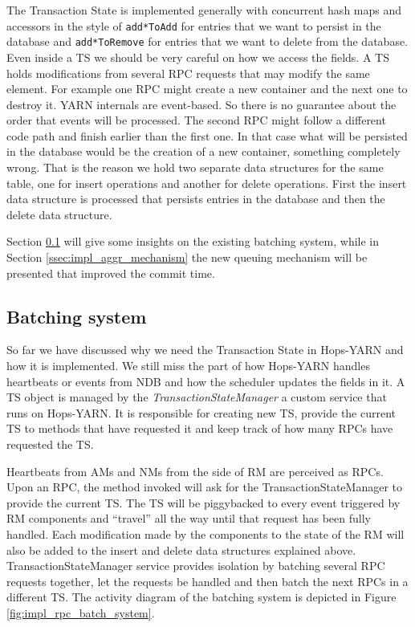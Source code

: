 The Transaction State is implemented generally with concurrent hash maps and
accessors in the style of \texttt{add*ToAdd} for entries that we
want to persist in the database and \texttt{add*ToRemove} for entries
that we want to delete from the database. Even inside a TS we should
be very careful on how we access the fields. A TS holds modifications
from several RPC requests that may modify the same element. For
example one RPC might create a new container and the next one to
destroy it. YARN internals are event-based. So there is no guarantee
about the order that events will be processed. The second RPC might
follow a different code path and finish earlier than the first one. In
that case what will be persisted in the database would be the creation
of a new container, something completely wrong. That is the reason
we hold two separate data structures for the same table, one for
insert operations and another for delete operations. First the insert
data structure is processed that persists entries in the database and
then the delete data structure.

Section \ref{ssec:impl_batch_system} will give some insights on
the existing batching system, while in Section
\ref{ssec:impl_aggr_mechanism} the new queuing
mechanism will be presented that improved the commit time.

\subsection{Batching system}
\label{ssec:impl_batch_system}
So far we have discussed why we need the Transaction State in
Hops-YARN and how it is implemented. We still miss the part of how
Hops-YARN handles heartbeats or events from NDB and how the scheduler
updates the fields in it. A TS object is managed by the
\emph{TransactionStateManager} a custom service that runs on Hops-YARN.
It is responsible for creating new TS, provide the
current TS to methods that have requested it and keep track of how many
RPCs have requested the TS.

Heartbeats from AMs and NMs from the side of RM are perceived as
RPCs. Upon an RPC, the method invoked will ask for the TransactionStateManager
to provide the current TS. The TS will be piggybacked to every event
triggered by RM components and ``travel'' all the way until that
request has been fully handled. Each modification made by the components
to the state of the RM will also be added to the insert and delete
data structures explained above. TransactionStateManager service
provides isolation by batching several RPC requests together, let the
requests be handled and then batch the next RPCs in a different
TS. The activity diagram of the batching system is depicted in Figure
\ref{fig:impl_rpc_batch_system}.

